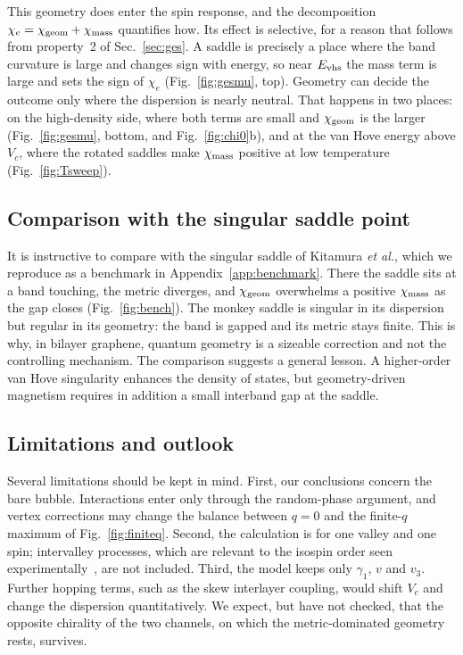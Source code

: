 \documentclass[aps,prb,twocolumn,superscriptaddress,floatfix,nofootinbib]{revtex4-2}
\newcommand{\chie}{\chi_{e}}
\newcommand{\chig}{\chi_{\rm geom}}
\newcommand{\chim}{\chi_{\rm mass}}
\newcommand{\Evhs}{E_{\rm vhs}}
\begin{document}
This geometry does enter the spin response, and the decomposition $\chie=\chig+\chim$ quantifies how. Its effect is selective, for a reason that follows from property~2 of Sec.~\ref{sec:ges}. A saddle is precisely a place where the band curvature is large and changes sign with energy, so near $\Evhs$ the mass term is large and sets the sign of $\chie$ (Fig.~\ref{fig:gesmu}, top). Geometry can decide the outcome only where the dispersion is nearly neutral. That happens in two places: on the high-density side, where both terms are small and $\chig$ is the larger (Fig.~\ref{fig:gesmu}, bottom, and Fig.~\ref{fig:chi0}b), and at the van Hove energy above $V_c$, where the rotated saddles make $\chim$ positive at low temperature (Fig.~\ref{fig:Tsweep}).

\subsection{Comparison with the singular saddle point}

It is instructive to compare with the singular saddle of Kitamura \emph{et al.}, which we reproduce as a benchmark in Appendix~\ref{app:benchmark}. There the saddle sits at a band touching, the metric diverges, and $\chig$ overwhelms a positive $\chim$ as the gap closes (Fig.~\ref{fig:bench}). The monkey saddle is singular in its dispersion but regular in its geometry: the band is gapped and its metric stays finite. This is why, in bilayer graphene, quantum geometry is a sizeable correction and not the controlling mechanism. The comparison suggests a general lesson. A higher-order van Hove singularity enhances the density of states, but geometry-driven magnetism requires in addition a small interband gap at the saddle.

\subsection{Limitations and outlook}

Several limitations should be kept in mind. First, our conclusions concern the bare bubble. Interactions enter only through the random-phase argument, and vertex corrections may change the balance between $q=0$ and the finite-$q$ maximum of Fig.~\ref{fig:finiteq}. Second, the calculation is for one valley and one spin; intervalley processes, which are relevant to the isospin order seen experimentally~\cite{Zhou2022,Seiler2022,delaBarrera2022}, are not included. Third, the model keeps only $\gamma_1$, $v$ and $v_3$. Further hopping terms, such as the skew interlayer coupling, would shift $V_c$ and change the dispersion quantitatively. We expect, but have not checked, that the opposite chirality of the two channels, on which the metric-dominated geometry rests, survives.
\end{document}
